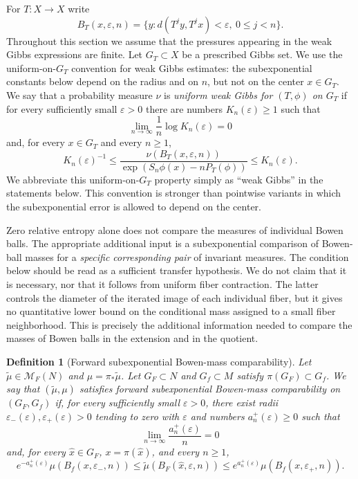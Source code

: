 \documentclass[11pt,a4paper]{article}
\newtheorem{definition}[theorem]{Definition}
\newcommand{\M}{\mathcal M}
\newcommand{\eps}{\varepsilon}
\begin{document}
For $T:X\to X$ write
\[
B_T(x,\eps,n)=\{y:d(T^jy,T^jx)<\eps,\ 0\le j<n\}.
\]
Throughout this section we assume that the pressures appearing in the weak
Gibbs expressions are finite. Let $G_T\subset X$ be a prescribed Gibbs set.
We use the uniform-on-$G_T$ convention for weak Gibbs estimates: the
subexponential constants below depend on the radius and on $n$, but not on
the center $x\in G_T$. We say that a probability measure $\nu$ is
\emph{uniform weak Gibbs for $(T,\phi)$ on $G_T$} if for every
sufficiently small $\eps>0$ there are numbers $K_n(\eps)\ge1$ such that
\begin{equation}
\lim_{n\to\infty}\frac1n\log K_n(\eps)=0
\label{eq:weak-gibbs-subexp}
\end{equation}
and, for every $x\in G_T$ and every $n\ge1$,
\begin{equation}
K_n(\eps)^{-1}
\le
\frac{\nu(B_T(x,\eps,n))}
{\exp(S_n\phi(x)-nP_T(\phi))}
\le K_n(\eps).
\label{eq:weak-gibbs-def}
\end{equation}
We abbreviate this uniform-on-$G_T$ property simply as ``weak Gibbs'' in the
statements below. This convention is stronger than pointwise variants in
which the subexponential error is allowed to depend on the center.

Zero relative entropy alone does not compare the measures of individual
Bowen balls. The appropriate additional input is a subexponential
comparison of Bowen-ball masses for a \emph{specific corresponding pair}
of invariant measures. The condition below should be read as a sufficient
transfer hypothesis. We do not claim that it is necessary, nor that it follows
from uniform fiber contraction. The latter controls the diameter of the
iterated image of each individual fiber, but it gives no quantitative lower
bound on the conditional mass assigned to a small fiber neighborhood. This
is precisely the additional information needed to compare the masses of
Bowen balls in the extension and in the quotient.

\begin{definition}[Forward subexponential Bowen-mass comparability]
\label{def:forward-bowen-comparison}
Let $\widetilde\mu\in\M_F(N)$ and $\mu=\pi_*\widetilde\mu$. Let
$G_F\subset N$ and $G_f\subset M$ satisfy $\pi(G_F)\subset G_f$. We say
that $(\widetilde\mu,\mu)$ satisfies \emph{forward subexponential
Bowen-mass comparability on $(G_F,G_f)$} if, for every sufficiently small
$\eps>0$, there exist radii
$\eps_-(\eps),\eps_+(\eps)>0$ tending to zero with $\eps$ and numbers
$a_n^{+}(\eps)\ge0$ such that
\[
\lim_{n\to\infty}\frac{a_n^{+}(\eps)}n=0
\]
and, for every $\hat x\in G_F$, $x=\pi(\hat x)$, and every $n\ge1$,
\begin{equation}
e^{-a_n^{+}(\eps)}\mu(B_f(x,\eps_-,n))
\le \widetilde\mu(B_F(\hat x,\eps,n))
\le e^{a_n^{+}(\eps)}\mu(B_f(x,\eps_+,n)).
\label{eq:bowen-comp-forward}
\end{equation}
\end{definition}
\end{document}
